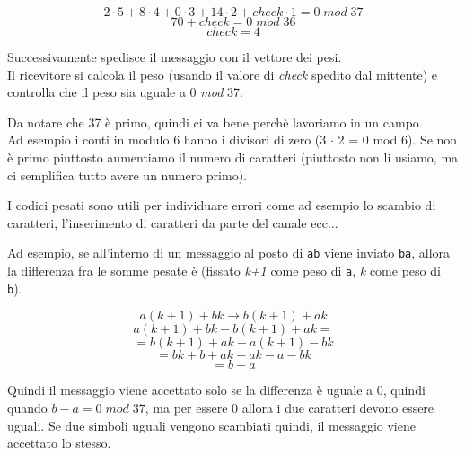 \begin{equation*}
2 \cdot 5 + 8 \cdot 4 + 0 \cdot 3 + 14 \cdot 2 + check \cdot 1 = 0 \; mod \; 37
\end{equation*}
\begin{equation*}
70 + check = 0 \; mod \; 36
\end{equation*}
\begin{equation*}
check = 4
\end{equation*}

Successivamente spedisce il messaggio con il vettore dei pesi.\\
Il ricevitore si calcola il peso (usando il valore di \textit{check} spedito dal mittente) e controlla che il peso sia uguale a 0 \textit{mod} 37.

Da notare che 37 è primo, quindi ci va bene perchè lavoriamo in un campo.\\
Ad esempio i conti in modulo 6 hanno i divisori di zero (3 $\cdot$ 2 = 0 mod 6).
Se non è primo piuttosto aumentiamo il numero di caratteri (piuttosto non li usiamo, ma ci semplifica tutto avere un numero primo).

I codici pesati sono utili per individuare errori come ad esempio lo scambio di caratteri, l'inserimento di caratteri da parte del canale ecc...

\medskip

Ad esempio, se all'interno di un messaggio al posto di \texttt{ab} viene inviato \texttt{ba}, allora la differenza fra le somme pesate è (fissato \textit{k+1} come peso di \texttt{a}, \textit{k} come peso di \texttt{b}).

\begin{equation*}
a(k+1)+bk \rightarrow b(k+1)+ak
\end{equation*}
\begin{equation*}
a(k+1)+bk - b(k+1)+ak = 
\end{equation*}
\begin{equation*}
= b(k+1)+ak - a(k+1) -bk
\end{equation*}
\begin{equation*}
= bk +b+ak-ak-a-bk
\end{equation*}
\begin{equation*}
= b-a
\end{equation*}

Quindi il messaggio viene accettato solo se la differenza è uguale a 0, quindi quando $b-a = 0 \; mod \; 37$, ma per essere 0 allora i due caratteri devono essere uguali.
Se due simboli uguali vengono scambiati quindi, il messaggio viene accettato lo stesso.

